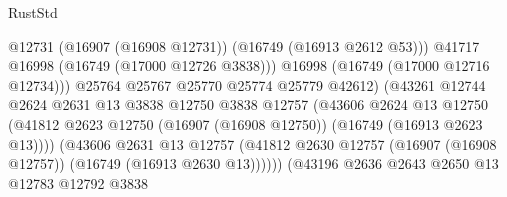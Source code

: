 \begin{lexlean}{RustStd}
\begin{coremodule}
                                                @12731
                                                (@16907 (@16908 @12731))
                                                (@16749 (@16913 @2612 @53)))
                                              @41717
                                              @16998
                                              (@16749 (@17000 @12726 @3838)))
                                            @16998
                                            (@16749 (@17000 @12716 @12734)))
                                          @25764
                                          @25767
                                          @25770
                                          @25774
                                          @25779
                                          @42612)
                                        (@43261
                                          @12744
                                          @2624
                                          @2631
                                          @13
                                          @3838
                                          @12750
                                          @3838
                                          @12757
                                          (@43606
                                            @2624
                                            @13
                                            @12750
                                            (@41812
                                              @2623
                                              @12750
                                              (@16907 (@16908 @12750))
                                              (@16749 (@16913 @2623 @13))))
                                          (@43606
                                            @2631
                                            @13
                                            @12757
                                            (@41812
                                              @2630
                                              @12757
                                              (@16907 (@16908 @12757))
                                              (@16749 (@16913 @2630 @13))))))
                                      (@43196
                                        @2636
                                        @2643
                                        @2650
                                        @13
                                        @12783
                                        @12792
                                        @3838

\end{coremodule}
\end{lexlean}
